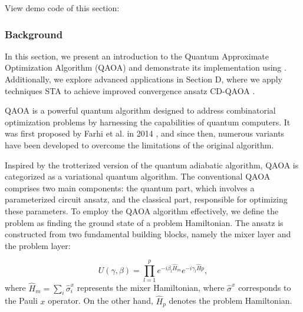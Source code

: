 


View demo code of this section: 

\subsubsection{Background}

In this section, we present an introduction to the Quantum Approximate Optimization Algorithm (QAOA) and demonstrate its implementation using \MindQuantum. Additionally, we explore advanced applications in Section D, where we apply techniques STA to achieve improved convergence ansatz CD-QAOA \cite{PhysRevResearch.4.013141}.


QAOA is a powerful quantum algorithm designed to address combinatorial optimization problems by harnessing the capabilities of quantum computers. It was first proposed by Farhi et al. in 2014 \cite{farhi2014quantum}, and since then, numerous variants have been developed to overcome the limitations of the original algorithm.

Inspired by the trotterized version of the quantum adiabatic algorithm, QAOA is categorized as a variational quantum algorithm. The conventional QAOA comprises two main components: the quantum part, which involves a parameterized circuit ansatz, and the classical part, responsible for optimizing these parameters. To employ the QAOA algorithm effectively, we define the problem as finding the ground state of a problem Hamiltonian. The ansatz is constructed from two fundamental building blocks, namely the mixer layer and the problem layer:

\begin{equation}
    U(\gamma, \beta) = \prod_{l=1}^p e^{-i\beta_l \hat{H}_{m}}e^{-i\gamma_l\hat{H}{{p}}},
\end{equation}
where $\hat{H}_{{m}} = \sum_i \hat{\sigma}^x_i$ represents the mixer Hamiltonian, where $\hat{\sigma}^x$ corresponds to the Pauli $x$ operator. On the other hand, $\hat{H}_{{p}}$ denotes the problem Hamiltonian.

